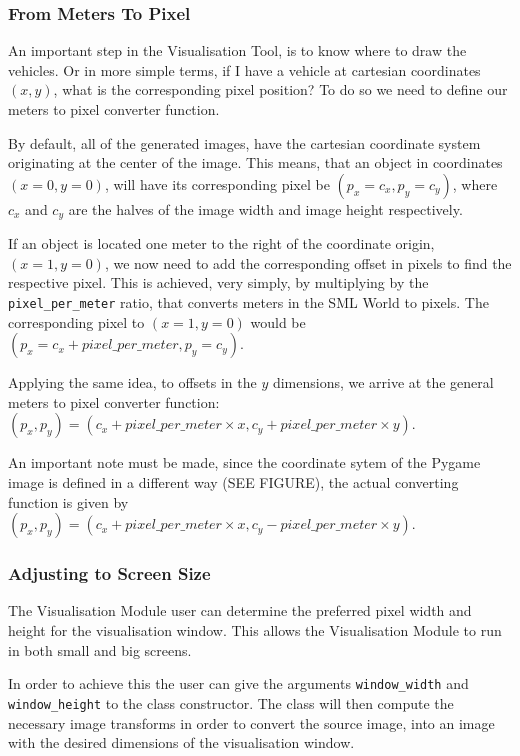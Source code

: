 \subsubsection{From Meters To Pixel}

An important step in the Visualisation Tool, is to know where to draw the vehicles. Or in more simple terms, if I have a vehicle at cartesian coordinates $(x, y)$, what is the corresponding pixel position? To do so we need to define our meters to pixel converter function.

By default, all of the generated images, have the cartesian coordinate system originating at the center of the image. This means, that an object in coordinates $(x = 0, y = 0)$, will have its corresponding pixel be $(p_x = c_x, p_y = c_y)$, where $c_x$ and $c_y$ are the halves of the image width and image height respectively.

If an object is located one meter to the right of the coordinate origin, $(x = 1, y = 0)$, we now need to add the corresponding offset in pixels to find the respective pixel. This is achieved, very simply, by multiplying by the \texttt{pixel\_per\_meter} ratio, that converts meters in the SML World to pixels. The corresponding pixel to $(x = 1, y = 0)$ would be $(p_x = c_x + pixel\_per\_meter, p_y = c_y)$.

Applying the same idea, to offsets in the $y$ dimensions, we arrive at the general meters to pixel converter function: $(p_x, p_y) = (c_x + pixel\_per\_meter\times x, c_y + pixel\_per\_meter\times y)$.

An important note must be made, since the coordinate sytem of the Pygame image is defined in a different way (SEE FIGURE), the actual converting function is given by $(p_x, p_y) = (c_x + pixel\_per\_meter\times x, c_y - pixel\_per\_meter\times y)$.


\subsubsection{Adjusting to Screen Size}

The Visualisation Module user can determine the preferred pixel width and height for the visualisation window. This allows the Visualisation Module to run in both small and big screens.

In order to achieve this the user can give the arguments \texttt{window\_width} and \texttt{window\_height} to the class constructor. The class will then compute the necessary image transforms in order to convert the source image, into an image with the desired dimensions of the visualisation window.


